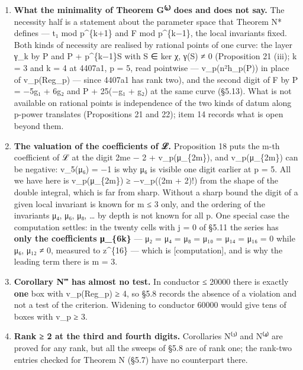 \documentclass[11pt,a4paper]{article}
\theoremstyle{named}
\begin{document}
\begin{enumerate}[leftmargin=1.4em,itemsep=.2em,topsep=.3em]
\item \textbf{What the minimality of Theorem G⁽ᵏ⁾ does and does not say.} The necessity half is a statement about the parameter space that Theorem N* defines — t₁ mod p\textasciicircum{}\{k+1\} and F mod p\textasciicircum{}\{k−1\}, the local invariants fixed. Both kinds of necessity are realised by rational points of one curve: the layer γ\_k by P and P + p\textasciicircum{}\{k−1\}S with S ∈ ker χ, γ(S) ≠ 0 (Proposition 21 (iii); k = 3 and k = 4 at 4407a1, p = 5, read pointwise — v\_p(n²h\_p(P)) in place of v\_p(Reg\_p) — since 4407a1 has rank two), and the second digit of F by P = −5g₁ + 6g₂ and P + 25(−g₁ + g₂) at the same curve (§5.13). What is not available on rational points is independence of the two kinds of datum along p-power translates (Propositions 21 and 22); item 14 records what is open beyond them.
\item \textbf{The valuation of the coefficients of ℒ.} Proposition 18 puts the m-th coefficient of ℒ at the digit 2me − 2 + v\_p(μ\_\{2m\}), and v\_p(μ\_\{2m\}) can be negative: v\_5(μ₆) = −1 is why μ₆ is visible one digit earlier at p = 5. All we have here is v\_p(μ\_\{2m\}) ≥ −v\_p((2m + 2)!) from the shape of the double integral, which is far from sharp. Without a sharp bound the digit of a given local invariant is known for m ≤ 3 only, and the ordering of the invariants μ₄, μ₆, μ₈, … by depth is not known for all p. One special case the computation settles: in the twenty cells with j = 0 of §5.11 the series has \textbf{only the coefficients μ\_\{6k\}} — μ₂ = μ₄ = μ₈ = μ₁₀ = μ₁₄ = μ₁₆ = 0 while μ₆, μ₁₂ ≠ 0, measured to z\textasciicircum{}\{16\} — which is [computation], and is why the leading term there is m = 3.
\item \textbf{Corollary N‴ has almost no test.} In conductor ≤ 20000 there is exactly \textbf{one} box with v\_p(Reg\_p) ≥ 4, so §5.8 records the absence of a violation and not a test of the criterion. Widening to conductor 60000 would give tens of boxes with v\_p ≥ 3.
\item \textbf{Rank ≥ 2 at the third and fourth digits.} Corollaries N⁽³⁾ and N⁽⁴⁾ are proved for any rank, but all the sweeps of §5.8 are of rank one; the rank-two entries checked for Theorem N (§5.7) have no counterpart there.

\end{enumerate}
\end{document}
